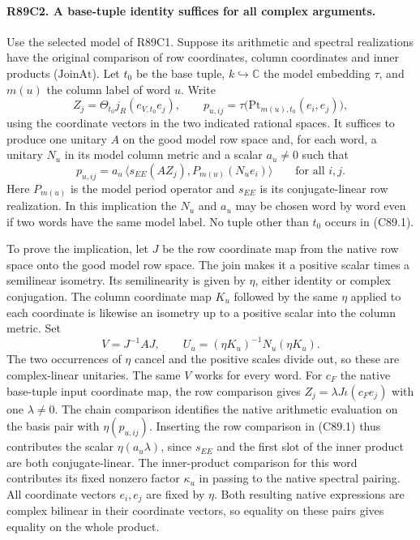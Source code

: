 \paragraph{R89C2. A base-tuple identity suffices for all complex arguments.}
Use the selected model of R89C1. Suppose its arithmetic and spectral
realizations have the original comparison of row coordinates, column
coordinates and inner products ($\mathrm{JoinAt}$). Let $t_0$ be the
base tuple, $k\hookrightarrow\mathbb C$ the model embedding $\tau$,
and $m(u)$ the column label of word $u$. Write
\[
  Z_j=\Theta_{t_0} j_R(e_{V,t_0} e_j),\qquad
  p_{u,ij}=\tau\bigl(\mathrm{Pt}_{m(u),t_0}(e_i,e_j)\bigr),
\]
using the coordinate vectors in the two indicated rational spaces.
It suffices to produce one unitary $A$ on the good model row space
and, for each word, a unitary $N_u$ in its model column metric
and a scalar $a_u\ne0$ such that
\[
  p_{u,ij}=a_u\,
  \big\langle s_{EE}(A Z_j),P_{m(u)}(N_u e_i)\big\rangle
                  \qquad\text{for all }i,j.                 \tag{C89.1}
\]
Here $P_{m(u)}$ is the model period operator and $s_{EE}$ is its
conjugate-linear row realization. In this implication the $N_u$ and
$a_u$ may be chosen word by word even if two words have the same model
label. No tuple other than $t_0$ occurs in (C89.1).

To prove the implication, let $J$ be the row coordinate map from the
native row space onto the good model row space. The join makes it a
positive scalar times a semilinear isometry. Its semilinearity is
given by $\eta$, either identity or complex conjugation. The column
coordinate map $K_u$ followed by the same $\eta$ applied to each
coordinate is likewise an isometry up to a positive scalar into the
column metric. Set
\[
  V=J^{-1}AJ,\qquad
  U_u=(\eta K_u)^{-1}N_u(\eta K_u).
\]
The two occurrences of $\eta$ cancel and the positive scales divide
out, so these are complex-linear unitaries. The same $V$ works for
every word. For $c_F$ the native base-tuple input coordinate map, the
row comparison gives $Z_j=\lambda J\iota(c_F e_j)$ with one
$\lambda\ne0$. The chain comparison identifies the native arithmetic
evaluation on the basis pair with $\eta(p_{u,ij})$. Inserting the row
comparison in (C89.1) thus contributes the scalar $\eta(a_u\lambda)$, since
$s_{EE}$ and the first slot of the inner product are both
conjugate-linear. The inner-product comparison for this word contributes
its fixed nonzero factor $\kappa_u$ in passing to the native spectral
pairing. All coordinate vectors $e_i,e_j$ are fixed by $\eta$.
Both resulting native expressions are complex bilinear in their
coordinate vectors, so equality on these pairs gives equality on the
whole product.

